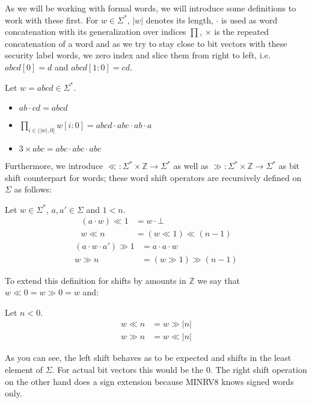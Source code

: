 As we will be working with formal words, we will introduce some definitions to work with these first.
For $ w  \in \Sigma^* $, $ |w| $ denotes its length,
$ \cdot $ is used as word concatenation with its generalization over indices $ \prod $, $ \times $ is the repeated concatenation of a word and as we try to stay close to bit vectors with these security label words, we zero index and slice them from right to left, i.e. $ abcd[0] = d $ and $ abcd[1:0] = cd $.

\begin{example}
    Let $ w = abcd \in \Sigma^* $.
    \begin{itemize}
        \item $ ab \cdot cd = abcd $
        \item $ \prod_{i \in (|w|, 0]} w[i:0] = abcd \cdot abc \cdot ab \cdot a $
        \item $ 3 \times abc = abc \cdot abc \cdot abc $
    \end{itemize}
\end{example}

Furthermore, we introduce $ \ll : \Sigma^* \times \mathbb{Z} \rightarrow \Sigma^* $ as well as $ \gg : \Sigma^* \times \mathbb{Z} \rightarrow \Sigma^* $ as bit shift counterpart for words; these word shift operators are recursively defined on $ \Sigma $ as follows:

Let $ w \in \Sigma^* $, $ a, a' \in \Sigma $ and $ 1 < n $.
\begin{align*}
    (a \cdot w) \ll 1 &= w \cdot \bot \\
    w \ll n &= (w \ll 1) \ll (n - 1)
\end{align*}
\begin{align*}
    (a \cdot w \cdot a') \gg 1 &= a \cdot a \cdot w \\
    w \gg n &= (w \gg 1) \gg (n - 1)
\end{align*}

To extend this definition for shifts by amounts in $ \mathbb{Z} $ we say that $ w \ll 0 = w \gg 0 = w $ and:

Let $ n < 0 $.
\begin{align*}
    w \ll n &= w \gg |n| \\
    w \gg n &= w \ll |n|
\end{align*}

As you can see, the left shift behaves as to be expected and shifts in the least element of $ \Sigma $.
For actual bit vectors this would be the 0.
The right shift operation on the other hand does a sign extension because MINRV8 knows signed words only.

